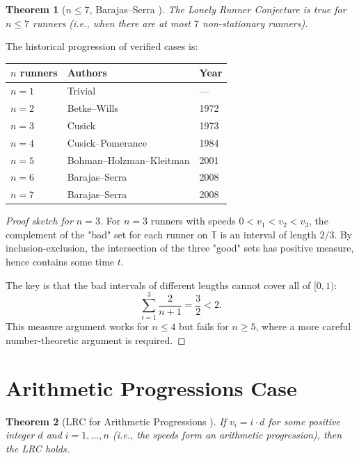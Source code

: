 \documentclass[12pt,a4paper]{amsart}
\newtheorem{theorem}{Theorem}[section]
\theoremstyle{definition}
\theoremstyle{remark}
\newcommand{\T}{\mathbb{T}}
\begin{document}
\begin{theorem}[$n \leq 7$, Barajas--Serra \cite{BarajasSerra2008}]\label{thm:n7}
The Lonely Runner Conjecture is true for $n \leq 7$ runners (i.e., when there are
at most $7$ non-stationary runners).
\end{theorem}

The historical progression of verified cases is:
\begin{center}
\begin{tabular}{lll}
\toprule
\textbf{$n$ runners} & \textbf{Authors} & \textbf{Year} \\
\midrule
$n = 1$ & Trivial & --- \\
$n = 2$ & Betke--Wills \cite{BetkeWills1972} & 1972 \\
$n = 3$ & Cusick \cite{Cusick1973} & 1973 \\
$n = 4$ & Cusick--Pomerance \cite{CusickPomerance1984} & 1984 \\
$n = 5$ & Bohman--Holzman--Kleitman \cite{BohmanHolzmanKleitman2001} & 2001 \\
$n = 6$ & Barajas--Serra \cite{BarajasSerra2008} & 2008 \\
$n = 7$ & Barajas--Serra \cite{BarajasSerra2008} & 2008 \\
\bottomrule
\end{tabular}
\end{center}

\begin{proof}[Proof sketch for $n = 3$]
For $n = 3$ runners with speeds $0 < v_1 < v_2 < v_3$, the complement of the "bad"
set for each runner on $\T$ is an interval of length $2/3$. By inclusion-exclusion,
the intersection of the three "good" sets has positive measure, hence contains
some time $t$.

The key is that the bad intervals of different lengths cannot cover all of $[0, 1)$:
\[
  \sum_{i=1}^{3} \frac{2}{n+1} = \frac{3}{2} < 2.
\]
This measure argument works for $n \leq 4$ but fails for $n \geq 5$, where
a more careful number-theoretic argument is required.
\end{proof}

\section{Arithmetic Progressions Case}\label{sec:ap}

\begin{theorem}[LRC for Arithmetic Progressions \cite{BieniaEtal1998}]\label{thm:lrc_ap}
If $v_i = i \cdot d$ for some positive integer $d$ and $i = 1, \ldots, n$
(i.e., the speeds form an arithmetic progression), then the LRC holds.
\end{theorem}
\end{document}
